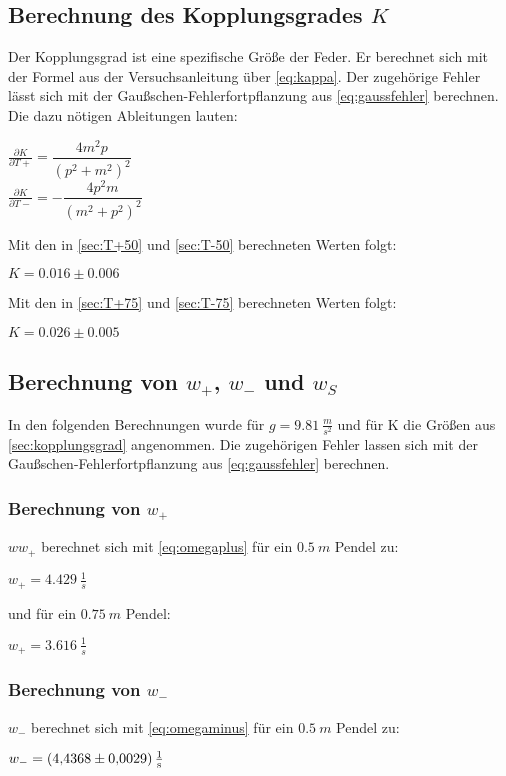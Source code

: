 \subsection{Berechnung des Kopplungsgrades $K$}
\label{sec:kopplungsgrad}
Der Kopplungsgrad ist eine spezifische Größe der Feder.
Er berechnet sich mit der Formel aus der Versuchsanleitung
über \autoref{eq:kappa}. Der zugehörige Fehler lässt sich mit der Gaußschen-Fehlerfortpflanzung aus 
\autoref{eq:gaussfehler} berechnen. Die dazu nötigen Ableitungen lauten:
\begin{center}
  


  $\frac{\partial K}{\partial T+}=\dfrac{4m^2p}{\left(p^2+m^2\right)^2}$\\
  $\frac{\partial K}{\partial T-}=-\dfrac{4p^2m}{\left(m^2+p^2\right)^2}$
\end{center}
Mit den in \autoref{sec:T+50} und \autoref{sec:T-50} berechneten Werten folgt:
\begin{center}
  $K=0.016\pm0.006$
\end{center}
Mit den in \autoref{sec:T+75} und \autoref{sec:T-75} berechneten Werten folgt:

\begin{center}
  $K=0.026\pm0.005$
\end{center}

\subsection{Berechnung von $w_+$, $w_-$ und $w_S$}
In den folgenden Berechnungen wurde für $g=\SI{9,81}{\frac{m}{s^2}}$ und für K die Größen aus
\autoref{sec:kopplungsgrad} angenommen. Die zugehörigen Fehler lassen sich mit der 
Gaußschen-Fehlerfortpflanzung aus \autoref{eq:gaussfehler} berechnen.

\subsubsection{Berechnung von $w_+$}
$ww_+$ berechnet sich mit \autoref{eq:omegaplus} für ein $\SI{0,5}{m}$ Pendel zu:
\begin{center}
  $w_+=\SI{4.429}{\frac{1}{s}}$
\end{center}
und für ein $\SI{0,75}{m}$ Pendel:
\begin{center}
  $w_+=\SI{3.616}{\frac{1}{s}}$
\end{center}
\subsubsection{Berechnung von $w_-$}
$w_-$ berechnet sich mit \autoref{eq:omegaminus} für ein $\SI{0,5}{m}$ Pendel zu:
\begin{center}
  $w_-=\SI{4.4368\pm0.0029}{\frac{1}{s}}$
\end{center}

